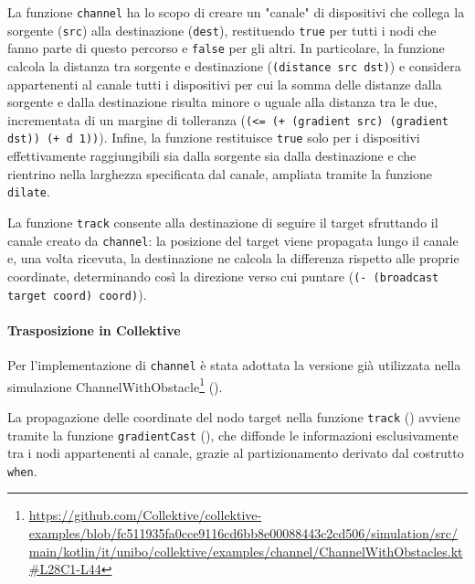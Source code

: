 La funzione \texttt{channel} ha lo scopo di creare un "canale" di dispositivi che collega la sorgente (\texttt{src}) alla destinazione (\texttt{dest}), restituendo \texttt{true} per tutti i nodi che fanno parte di questo percorso e \texttt{false} per gli altri. 
%
In particolare, la funzione calcola la distanza tra sorgente e destinazione (\texttt{(distance src dst)}) e considera appartenenti al canale tutti i dispositivi per cui la somma delle distanze dalla sorgente e dalla destinazione risulta minore o uguale alla distanza tra le due, incrementata di un margine di tolleranza (\texttt{(<= (+ (gradient src) (gradient dst)) (+ d 1))}).
%
Infine, la funzione restituisce \texttt{true} solo per i dispositivi effettivamente raggiungibili sia dalla sorgente sia dalla destinazione e che rientrino nella larghezza specificata dal canale, ampliata tramite la funzione \texttt{dilate}.

La funzione \texttt{track} consente alla destinazione di seguire il target sfruttando il canale creato da \texttt{channel}: la posizione del target viene propagata lungo il canale e, una volta ricevuta, la destinazione ne calcola la differenza rispetto alle proprie coordinate, determinando così la direzione verso cui puntare (\texttt{(- (broadcast target coord) coord)}).


\paragraph{Trasposizione in Collektive} Per l'implementazione di \texttt{channel} è stata adottata la versione già utilizzata nella simulazione ChannelWithObstacle\footnote{\url{https://github.com/Collektive/collektive-examples/blob/fc511935fa0cce9116cd6bb8e00088443c2cd506/simulation/src/main/kotlin/it/unibo/collektive/examples/channel/ChannelWithObstacles.kt\#L28C1-L44}} ().

La propagazione delle coordinate del nodo target nella funzione \texttt{track} () avviene tramite la funzione \texttt{gradientCast} (), che diffonde le informazioni esclusivamente tra i nodi appartenenti al canale, grazie al partizionamento derivato dal costrutto \texttt{when}.

\newpage


